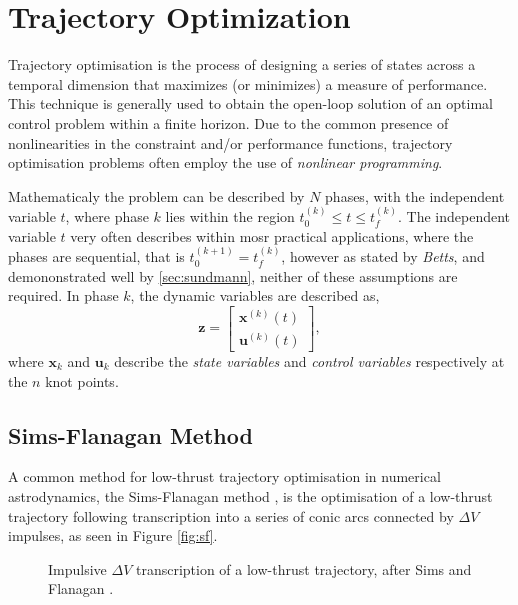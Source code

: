 \chapter{Trajectory Optimization}
Trajectory optimisation is the process of designing a series of states across a
temporal dimension that maximizes (or minimizes) a measure of performance. This
technique is generally used to obtain the open-loop solution of an optimal
control problem within a finite horizon. Due to the common presence of
nonlinearities in the constraint and/or performance functions, trajectory
optimisation problems often employ the use of \textit{nonlinear programming}.

Mathematicaly the problem can be described by $N$ phases, with the independent
variable $t$, where phase $k$ lies within the region
$t_0^{(k)}\leq{t}\leq{t_f^{(k)}}$. The independent variable $t$ very often
describes  within mosr practical applications, where the phases are
sequential, that is $t_0^{(k+1)}=t_f^{(k)}$, however as stated by
\textit{Betts}, and demononstrated well by \autoref{sec:sundmann}, neither of
these assumptions are required. In phase $k$, the dynamic variables are
described as,
\begin{equation}
  \mathbf{z}=
  \begin{bmatrix}
  \mathbf{x}^{(k)}(t) \\
  \mathbf{u}^{(k)}(t)
  \end{bmatrix},
\end{equation}
where $\mathbf{x}_k$ and $\mathbf{u}_k$ describe the \textit{state variables}
and \textit{control variables} respectively at the $n$ knot points.

\section{Sims-Flanagan Method}
A common method for low-thrust trajectory optimisation in numerical
astrodynamics, the Sims-Flanagan method \cite{Sims2000}, is the optimisation of
a low-thrust trajectory following transcription into a series of conic arcs
connected by $\Delta{V}$ impulses, as seen in Figure \autoref{fig:sf}.

\begin{figure}[htp]
    \centering
    \label{fig:sf}
    \caption{
        Impulsive $\Delta{V}$ transcription of a low-thrust trajectory, after
        Sims and Flanagan \cite{Yam2010}.
    }
\end{figure}

